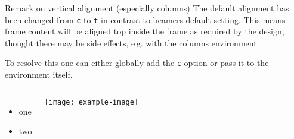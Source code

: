 \documentclass[
	english,%
	design=2023,%
]{tudabeamer}
\newcommand*{\code}[1]{\texttt{#1}}
\begin{document}
\begin{frame}{Remark on vertical alignment (especially columns)}
The default alignment has been changed from \code{c} to \code{t} in contrast to beamers default setting.
This means frame content will be aligned top inside the frame as required by the design, thought there may be side effects, e\,g.
with the columns environment.

To resolve this one can either globally add the \code{c} option or pass it to the environment itself.

\begin{columns}[onlytextwidth,c]
	\begin{itemize}
		\item one
		\item two
	\end{itemize}
	\texttt{[image: example-image]}
\end{columns}
\end{frame}
\end{document}
